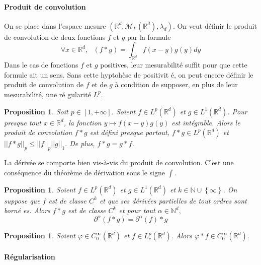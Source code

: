 \documentclass[3pt]{article}
\newtheorem{proposition}[theorem]{Proposition}
\begin{document}
\bigskip 

\paragraph{Produit de convolution}

On se place dans l'espace mesure $(\mathbb{R}^{d},\mathcal{M}_{L}(\mathbb{R}%
^{d}),\lambda _{d})$. On veut d\'{e}finir le produit de convolution de deux
fonctions $f$ et $g$ par la formule%
\begin{equation*}
\forall x\in \mathbb{R}^{d},\text{ }(f\ast g)=\int_{\mathbb{R}%
^{d}}f(x-y)g(y)dy
\end{equation*}%
Dans le cas de fonctions $f$ et $g$ positives, leur mesurabilit\'{e} suffit
pour que cette formule ait un sens. Sans cette hyptoh\`{e}se de positivit%
\'{e}, on peut encore d\'{e}finir le produit de convolution de $f$ et de $g$ 
\`{a} condition de supposer, en plus de leur mesurabilit\'{e}, une r\'{e}%
gularit\'{e} $L^{p}$.

\bigskip 

\begin{proposition}
Soit $p\in \left[ 1,+\infty \right] $. Soient $f\in L^{p}(\mathbb{R}^{d})$
et $g\in L^{1}(\mathbb{R}^{d})$. Pour presque tout $x\in \mathbb{R}^{d}$, la
fonction $y\mapsto f(x-y)g(y)$ est int\'{e}grable. Alors le produit de
convolution $f\ast g$ est d\'{e}fini presque partout, $f\ast g\in L^{p}(%
\mathbb{R}^{d})$ et $\left\vert \left\vert f\ast g\right\vert \right\vert
_{p}\leq \left\vert \left\vert f\right\vert \right\vert _{p}\left\vert
\left\vert g\right\vert \right\vert _{1}.$ De plus, $f\ast g=g\ast f$.
\end{proposition}

\bigskip 

La d\'{e}riv\'{e}e se comporte bien vis-\`{a}-vis du produit de convolution.
C'est une cons\'{e}quence du th\'{e}or\`{e}me de d\'{e}rivation sous le
signe $\int .$

\bigskip 

\begin{proposition}
Soient $f\in L^{p}(\mathbb{R}^{d})$ et $g\in L^{1}(\mathbb{R}^{d})$ et $k\in 
\mathbb{N\cup }\left\{ \infty \right\} $. On suppose que $f$ est de classe $%
C^{k}$ et que ses d\'{e}riv\'{e}es partielles de tout ordres sont born\'{e}%
es. Alors $f\ast g$ est de classe $C^{k}$ et pour tout $\alpha \in \mathbb{N}%
^{d},$%
\begin{equation*}
\partial ^{\alpha }\left( f\ast g\right) =\partial ^{\alpha }\left( f\right)
\ast g
\end{equation*}
\end{proposition}

\bigskip 

\begin{proposition}
Soient $\varphi \in C_{0}^{\infty }(\mathbb{R}^{d})$ et $f\in L_{c}^{p}(%
\mathbb{R}^{d}).$ Alors $\varphi \ast f\in C_{0}^{\infty }(\mathbb{R}^{d}).$
\end{proposition}

\bigskip 

\paragraph{R\'{e}gularisation}

\bigskip 

\bigskip 

\bigskip 
\end{document}
